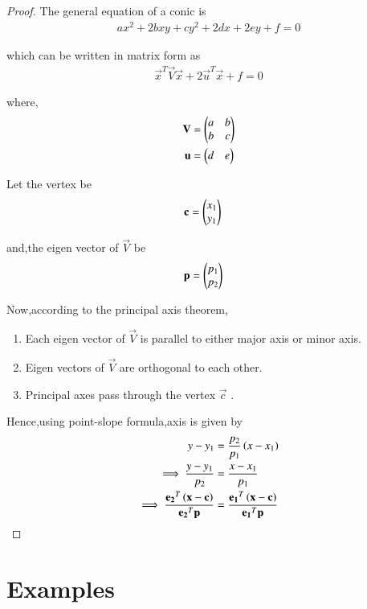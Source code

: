 \documentclass[journal,12pt,twocolumn]{IEEEtran}
\begin{document}
\begin{proof}
The general equation of a conic is
\begin{align}
  ax^2+2bxy+cy^2+2dx+2ey+f=0
\end{align}

which can be written in matrix form as
\begin{align}
    \vec{x}^T\vec{V}\vec{x} + 2\vec{u}^T\vec{x} + f =0
\end{align}

where,
\begin{align}
    \mathbf{V} &=\begin{pmatrix}a & b \\ b& c\end{pmatrix}
    \\
    \mathbf{u} &= \begin{pmatrix}d & e\end{pmatrix}
\end{align}

Let the vertex be
\begin{align}
    \mathbf{c} &= \begin{pmatrix}x_1 \\ y_1\end{pmatrix}
\end{align}

and,the eigen vector of $\vec{V}$ be
\begin{align}
    \mathbf{p} &= \begin{pmatrix}p_1 \\ p_2\end{pmatrix}
\end{align}

Now,according to the principal axis theorem,
\begin{enumerate}
    \item Each eigen vector of $\vec{V}$ is parallel to either major axis or minor axis.
    \item Eigen vectors of $\vec{V}$ are orthogonal to each other.
    \item Principal axes pass through the vertex $\vec{c}$ .
\end{enumerate}

Hence,using point-slope formula,axis is given by
\begin{align}
    y-y_1 &= \frac{p_2}{p_1}\left(x-x_1\right) \\
    \implies \frac{y-y_1}{p_2} &= \frac{x-x_1}{p_1} \\
    \implies \frac{\mathbf{e_2}^T\left(\mathbf{x}-\mathbf{c}\right)}{{\mathbf{e_2}^T\mathbf{p}}} &= \frac{\mathbf{e_1}^T\left(\mathbf{x}-\mathbf{c}\right)}{{\mathbf{e_1}^T\mathbf{p}}}
\end{align}

\end{proof}

\section{Examples}
\end{document}
